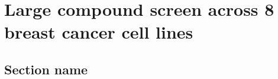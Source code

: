 \documentclass[a4paper,11pt,twoside,openright]{scrbook}
\begin{document}
\chapter{Large compound screen across 8 breast cancer cell lines} \label{chapter:screen}

\section{Section name}




\end{document}
